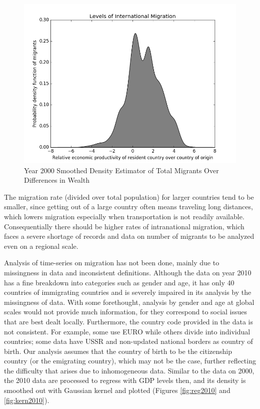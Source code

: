 \documentclass{acm_proc_article-sp}
\begin{document}
\begin{figure}[h]
    \includegraphics[width=\columnwidth, keepaspectratio=true]{Smoothed_Density_Estimator2000.png}
    \caption{Year 2000 Smoothed Density Estimator of Total Migrants Over Differences in Wealth}
    \label{fig:kern2000}
\end{figure}

The migration rate (divided over total population) for larger countries tend to be smaller, since getting out of a large country often means traveling long distances, which lowers migration especially when transportation is not readily available. Consequentially there should be higher rates of intranational migration, which faces a severe shortage of records and data on number of migrants to be analyzed even on a regional scale.

Analysis of time-series on migration has not been done, mainly due to missingness in data and inconsistent definitions. Although the data on year 2010 \cite{oecd} has a fine breakdown into categories such as gender and age, it has only 40 countries of immigrating countries and is severely impaired in its analysis by the missingness of data. With some forethought, analysis by gender and age at global scales would not provide much information, for they correspond to social issues that are best dealt locally. Furthermore, the country code provided in the data is not consistent. For example, some use EURO while others divide into individual countries; some data have USSR and non-updated national borders as country of birth. Our analysis assumes that the country of birth to be the citizenship country (or the emigrating country), which may not be the case, further reflecting the difficulty that arises due to inhomogeneous data. Similar to the data on 2000, the 2010 data are processed to regress with GDP levels then, and its density is smoothed out with Gaussian kernel and plotted (Figures \ref{fig:reg2010} and \ref{fig:kern2010}).
\end{document}

